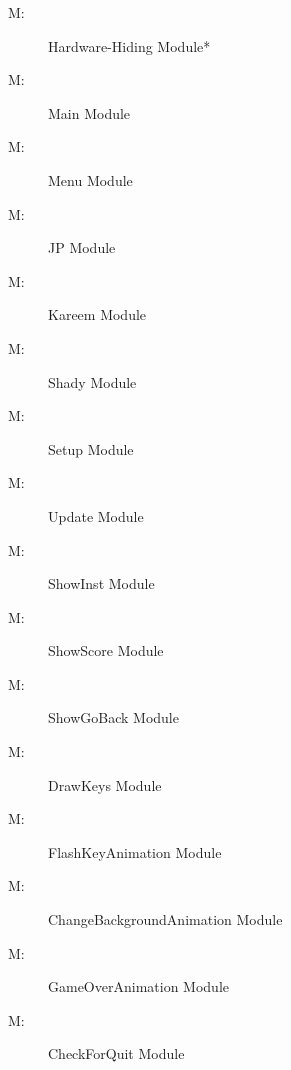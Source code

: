 \documentclass[12pt, titlepage]{article}
\newcounter{mnum}
\newcommand{\mthemnum}{M\themnum}
\begin{document}
\begin{description}
\item [ \mthemnum \label{mHH}:] Hardware-Hiding Module*
\item [ \mthemnum \label{mHH}:] Main Module
\item [ \mthemnum \label{mHH}:] Menu Module
\item [ \mthemnum \label{mHH}:] JP Module
\item [ \mthemnum \label{mHH}:] Kareem Module 
\item [ \mthemnum \label{mHH}:] Shady Module
\item [ \mthemnum \label{mHH}:] Setup Module
\item [ \mthemnum \label{mHH}:] Update Module
\item [ \mthemnum \label{mHH}:] ShowInst Module
\item [ \mthemnum \label{mHH}:] ShowScore Module
\item [ \mthemnum \label{mHH}:] ShowGoBack Module
\item [ \mthemnum \label{mHH}:] DrawKeys Module
\item [ \mthemnum \label{mHH}:] FlashKeyAnimation Module
\item [ \mthemnum \label{mHH}:] ChangeBackgroundAnimation Module
\item [ \mthemnum \label{mHH}:] GameOverAnimation Module
\item [ \mthemnum \label{mHH}:] CheckForQuit Module



\end{description}
\end{document}
